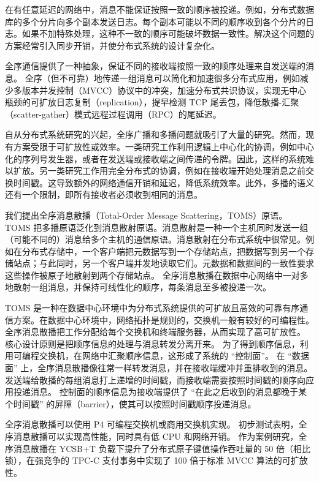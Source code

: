在有任意延迟的网络中，消息不能保证按照一致的顺序被投递。例如，分布式数据库的多个分片向多个副本发送日志。每个副本可能以不同的顺序收到各个分片的日志。如果不加特殊处理，这种不一致的顺序可能破坏数据一致性。解决这个问题的方案经常引入同步开销，并使分布式系统的设计复杂化。

全序通信提供了一种抽象，保证不同的接收端按照一致的顺序处理来自发送端的消息。
全序（但不可靠）地传递一组消息可以简化和加速很多分布式应用，例如减少多版本并发控制（MVCC）协议中的冲突，加速分布式共识协议，实现无中心瓶颈的可扩放日志复制（replication），提早检测 TCP 尾丢包，降低散播-汇聚（scatter-gather）模式远程过程调用（RPC）的尾延迟。

自从分布式系统研究的兴起，全序广播和多播问题就吸引了大量的研究。然而，现有方案受限于可扩放性或效率。一类研究工作利用逻辑上中心化的协调，例如中心化的序列号发生器，或者在发送端或接收端之间传递的令牌。因此，这样的系统难以扩放。另一类研究工作用完全分布式的协调，例如在接收端开始处理消息之前交换时间戳。这导致额外的网络通信开销和延迟，降低系统效率。此外，多播的语义还有一个限制，即所有接收者必须收到相同的消息。

我们提出全序消息散播（Total-Order Message Scattering，TOMS）原语。
TOMS 把多播原语泛化到消息散射原语。消息散射是一种一个主机同时发送一组（可能不同的）消息给多个主机的通信原语。消息散射在分布式系统中很常见。例如在分布式存储中，一个客户端把元数据写到一个存储站点，把数据写到另一个存储站点；与此同时，另一个客户端并发地读取它们。元数据和数据间的一致性要求这些操作被原子地散射到两个存储站点。
全序消息散播在数据中心网络中一对多地散射一组消息，并保持可线性化的顺序，每条消息至多被投递一次。

TOMS 是一种在数据中心环境中为分布式系统提供的可扩放且高效的可靠有序通信方案。在数据中心环境中，网络拓扑是规则的，交换机一般有较好的可编程性。
全序消息散播把工作分配给每个交换机和终端服务器，从而实现了高可扩放性。
核心设计原则是把顺序信息的处理与消息转发分离开来。
为了得到顺序信息，利用可编程交换机，在网络中汇聚顺序信息，这形成了系统的 ``控制面''。
在 ``数据面'' 上，全序消息散播像往常一样转发消息，并在接收端缓冲并重排收到的消息。
发送端给散播的每组消息打上递增的时间戳，而接收端需要按照时间戳的顺序向应用投递消息。
控制面的顺序信息为接收端提供了 ``在此之后收到的消息都晚于某个时间戳'' 的屏障（barrier），使其可以按照时间戳顺序投递消息。

全序消息散播可以使用 P4 可编程交换机或商用交换机实现。
初步测试表明，全序消息散播可以实现高性能，同时具有低 CPU 和网络开销。
作为案例研究，全序消息散播在 YCSB+T 负载下提升了分布式原子键值操作吞吐量的 50 倍（相比锁），在强竞争的 TPC-C 支付事务中实现了 100 倍于标准 MVCC 算法的可扩放性。

